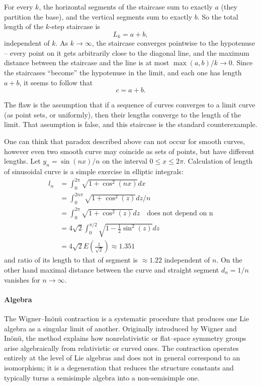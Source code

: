 For every $k$, the horizontal segments of the staircase sum to exactly $a$
(they partition the base), and the vertical segments sum to exactly $b$.
So the total length of the $k$-step staircase is
$$L_k = a + b,$$
independent of $k$. As $k\to\infty$, the staircase converges pointwise to the
hypotenuse -- every point on it gets arbitrarily close to the diagonal line,
and the maximum distance between the staircase and the line is at most
$\max(a,b)/k \to 0$. Since the staircases ``become'' the hypotenuse in the
limit, and each one has length $a+b$, it seems to follow that
$$c = a+b.$$

The flaw is the assumption that if a sequence of curves converges to a limit
curve (as point sets, or uniformly), then their lengths converge to the
length of the limit. That assumption is false, and this staircase is the
standard counterexample.

One can think that paradox described above can
not occur for smooth curves, however even two smooth curve may coincide as sets of 
points, but have different lengths. Let $ y_n= \sin(n x)/n $ on the  
interval $ 0\le x \le 2 \pi $. Calculation of length of sinusoidal curve 
is a simple exercise in elliptic integrals:
\begin{equation}
   \label {sin-length}
   \begin{split}
       l_n&=\int_0^{2 \pi}\sqrt{1+\cos^2(nx)}dx\\
       &=\int_0^{2 n \pi}\sqrt{1+\cos^2(z)}dz/n\\
       &=\int_0^{2 \pi}\sqrt{1+\cos^2(z)}dz\quad \text{does not depend on n}  \\
       &=4 \sqrt{2} \int_0^{\pi/2}\sqrt{1-\frac{1}{2} \sin^2(z)}dz\\
       &=4 \sqrt{2} E(\frac{1}{\sqrt{2}}) \approx 1.351
   \end{split}
\end{equation}  
and ratio of its length to that of segment is $ \approx 1.22 $ independent of $
n $. On the other hand maximal distance between the curve and straight segment
$ d_n=1/n $ vanishes for $ n\rightarrow \infty $.

\paragraph{Algebra}
The Wigner--In\"on\"u contraction is a systematic procedure that produces one Lie
algebra as a singular limit of another.  Originally introduced by Wigner and
In\"on\"u, the method explains how nonrelativistic or
flat--space symmetry groups arise algebraically from relativistic or curved
ones.  The contraction operates entirely at the level of Lie algebras and does
not in general correspond to an isomorphism; it is a degeneration that reduces
the structure constants and typically turns a semisimple algebra into a
non-semisimple one.


